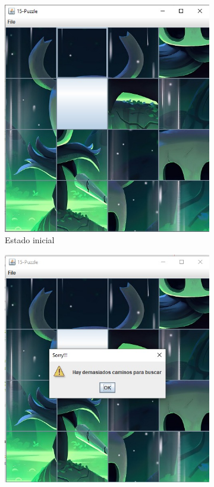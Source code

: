         \begin{figure}[!h]
          \centering
          \begin{subfigure}{0.3\textwidth}
            \includegraphics[width=\textwidth]{Imagenes/inicial5.jpg}
            \caption{Estado inicial}
          \end{subfigure}
          \hfill
          \begin{subfigure}{0.3\textwidth}
            \includegraphics[width=\textwidth]{Imagenes/bfs5.jpg}

\end{subfigure}
\end{figure}
